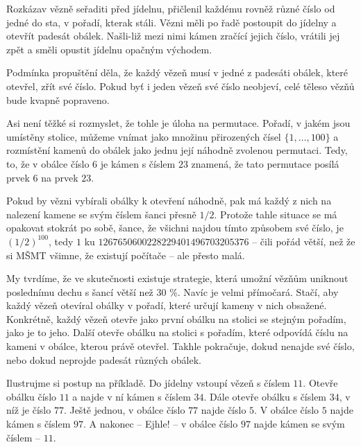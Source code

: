 Rozkázav vězně seřaditi před jídelnu, přičlenil každému rovněž různé číslo od
jedné do sta, v pořadí, kterak stáli. Vězni měli po řadě postoupit do jídelny a
otevřít padesát obálek. Našli-liž mezi nimi kámen zračící jejich číslo, vrátili
jej zpět a směli opustit jídelnu opačným východem.

Podmínka propuštění děla, že každý vězeň musí v jedné z padesáti obálek, které
otevřel, zřít své číslo. Pokud byť i jeden vězeň své číslo neobjeví, celé těleso
vězňů bude kvapně popraveno.

Asi není těžké si rozmyslet, že tohle je úloha na permutace. Pořadí, v jakém
jsou umístěny stolice, můžeme vnímat jako množinu přirozených čísel
$\{1,\ldots,100\}$ a rozmístění kamenů do obálek jako jednu její náhodně
zvolenou permutaci. Tedy, to, že v obálce číslo $6$ je kámen s číslem $23$
znamená, že tato permutace posílá prvek $6$ na prvek $23$.

Pokud by vězni vybírali obálky k otevření náhodně, pak má každý z nich na
nalezení kamene se svým číslem šanci přesně $1 / 2$. Protože tahle situace se má
opakovat stokrát po sobě, šance, že všichni najdou tímto způsobem své číslo, je
$(1 / 2)^{100}$, tedy $1$ ku $1 267 650 600 228 229 401 496 703 205 376$ -- čili
pořád větší, než že si MŠMT všimne, že existují počítače -- ale přesto malá.

My tvrdíme, že ve skutečnosti existuje strategie, která umožní vězňům uniknout
poslednímu dechu s šancí větší než 30 \%. Navíc je velmi přímočará. Stačí, aby
každý vězeň otevíral obálky v pořadí, které určují kameny v nich obsažené.
Konkrétně, každý vězeň otevře jako první obálku na stolici se stejným pořadím,
jako je to jeho. Další otevře obálku na stolici s pořadím, které odpovídá číslu
na kameni v obálce, kterou právě otevřel. Takhle pokračuje, dokud nenajde své
číslo, nebo dokud neprojde padesát různých obálek.

Ilustrujme si postup na příkladě. Do jídelny vstoupí vězeň s číslem $11$. Otevře
obálku číslo $11$ a najde v ní kámen s číslem $34$. Dále otevře obálku s číslem
$34$, v níž je číslo $77$. Ještě jednou, v obálce číslo $77$ najde číslo $5$. V
obálce číslo $5$ najde kámen s číslem $97$. A nakonec -- Ejhle! -- v obálce
číslo $97$ najde kámen se svým číslem -- $11$.

